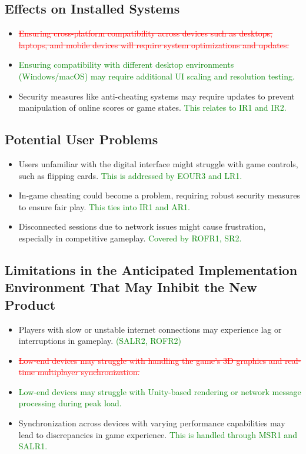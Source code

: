 \documentclass[12pt]{article}
\newcommand{\removed}[1]{\textcolor{red}{\sout{#1}}}
\newcommand{\added}[1]{\textcolor{green}{#1}}
\begin{document}
\subsection{Effects on Installed Systems}
\begin{itemize}
    \item \removed{Ensuring cross-platform compatibility across devices such as desktops, laptops, and mobile devices will require system optimizations and updates.}
    \item \added{Ensuring compatibility with different desktop environments (Windows/macOS) may require additional UI scaling and resolution testing.}
    \item Security measures like anti-cheating systems may require updates to prevent manipulation of online scores or game states. \added{This relates to IR1 and IR2.}
\end{itemize}

\subsection{Potential User Problems}
\begin{itemize}
    \item Users unfamiliar with the digital interface might struggle with game controls, such as flipping cards. \added{This is addressed by EOUR3 and LR1.}
    \item In-game cheating could become a problem, requiring robust security measures to ensure fair play. \added{This ties into IR1 and AR1.}
    \item Disconnected sessions due to network issues might cause frustration, especially in competitive gameplay. \added{Covered by ROFR1, SR2.}
\end{itemize}

\subsection{Limitations in the Anticipated Implementation Environment That May Inhibit the New Product}
\begin{itemize}
    \item Players with slow or unstable internet connections may experience lag or interruptions in gameplay. \added{(SALR2, ROFR2)}
    \item \removed{Low-end devices may struggle with handling the game’s 3D graphics and real-time multiplayer synchronization.}
    \item \added{Low-end devices may struggle with Unity-based rendering or network message processing during peak load.}
    \item Synchronization across devices with varying performance capabilities may lead to discrepancies in game experience. \added{This is handled through MSR1 and SALR1.}
\end{itemize}
\end{document}
